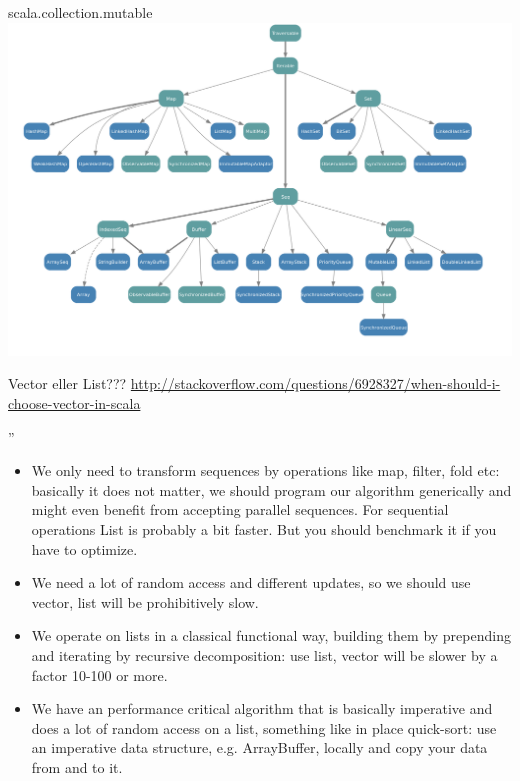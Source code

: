 \begin{Slide}{scala.collection.mutable}
\includegraphics[width=1.05\textwidth]{../img/collection/collection-mutable}
\end{Slide}


\begin{Slide}{Vector eller List???}\SlideFontTiny
\url{http://stackoverflow.com/questions/6928327/when-should-i-choose-vector-in-scala}

''
\begin{itemize}
\item We only need to transform sequences by operations like map, filter, fold etc: basically it does not matter, we should program our algorithm generically and might even benefit from accepting parallel sequences. For sequential operations List is probably a bit faster. But you should benchmark it if you have to optimize.

\item We need a lot of random access and different updates, so we should use vector, list will be prohibitively slow.

\item We operate on lists in a classical functional way, building them by prepending and iterating by recursive decomposition: use list, vector will be slower by a factor 10-100 or more.

\item We have an performance critical algorithm that is basically imperative and does a lot of random access on a list, something like in place quick-sort: use an imperative data structure, e.g. ArrayBuffer, locally and copy your data from and to it.


\end{itemize}
\end{Slide}

\fi





